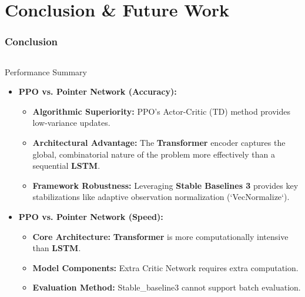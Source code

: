 \section{Conclusion \& Future Work}

\begin{frame}
    \frametitle{Conclusion}

    \begin{columns}[T]
        \begin{column}{0.5\textwidth}
            \begin{block}{Performance Summary}
                \begin{itemize}
                    \item \textbf{PPO vs. Pointer Network (Accuracy):} \\
                    \begin{itemize}
                        \item \textbf{Algorithmic Superiority:} PPO's Actor-Critic (TD) method provides low-variance updates.
                        \item \textbf{Architectural Advantage:} The \textbf{Transformer} encoder captures the global, combinatorial nature of the problem more effectively than a sequential \textbf{LSTM}.
                        \item \textbf{Framework Robustness:} Leveraging \textbf{Stable Baselines 3} provides key stabilizations like adaptive observation normalization (`VecNormalize`).
                    \end{itemize} \vspace{1em}

                    \item \textbf{PPO vs. Pointer Network (Speed):} \\
                    \begin{itemize}
                        \item \textbf{Core Architecture:} \textbf{Transformer} is more computationally intensive than \textbf{LSTM}.
                        \item \textbf{Model Components:} Extra Critic Network requires extra computation.
                        \item \textbf{Evaluation Method:} Stable\_baseline3 cannot support batch evaluation.
                    \end{itemize} \vspace{1em}                    
                \end{itemize}
            \end{block}
        \end{column}
        

\end{columns}
\end{frame}
